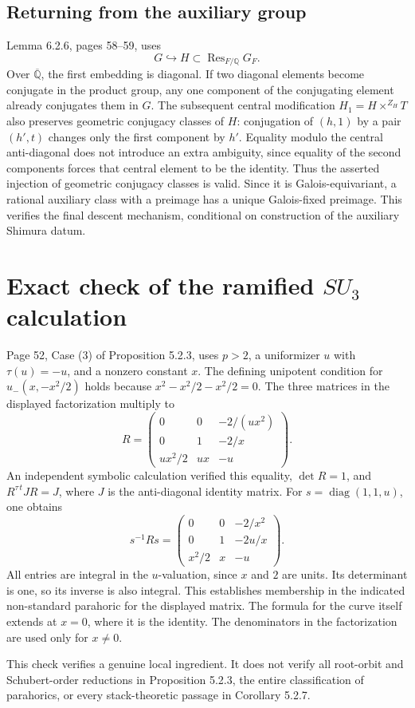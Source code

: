 \documentclass[10pt]{article}
\begin{document}
\subsection*{Returning from the auxiliary group}
Lemma 6.2.6, pages 58–59, uses \[G\hookrightarrow H\subset\operatorname{Res}_{F/\mathbb Q}G_F.\] Over \(\overline{\mathbb Q}\), the first embedding is diagonal. If two diagonal elements become conjugate in the product group, any one component of the conjugating element already conjugates them in \(G\). The subsequent central modification \(H_1=H\times^{Z_H}T\) also preserves geometric conjugacy classes of \(H\): conjugation of \((h,1)\) by a pair \((h',t)\) changes only the first component by \(h'\). Equality modulo the central anti-diagonal does not introduce an extra ambiguity, since equality of the second components forces that central element to be the identity. Thus the asserted injection of geometric conjugacy classes is valid. Since it is Galois-equivariant, a rational auxiliary class with a preimage has a unique Galois-fixed preimage. This verifies the final descent mechanism, conditional on construction of the auxiliary Shimura datum.\par
\section*{Exact check of the ramified \(SU_3\) calculation}
Page 52, Case (3) of Proposition 5.2.3, uses \(p>2\), a uniformizer \(u\) with \(\tau(u)=-u\), and a nonzero constant \(x\). The defining unipotent condition for \(u_-(x,-x^2/2)\) holds because \(x^2-x^2/2-x^2/2=0\). The three matrices in the displayed factorization multiply to \[R=
 \begin{pmatrix}
 0&0&-2/(ux^2)\\
 0&1&-2/x\\
 ux^2/2&ux&-u
 \end{pmatrix}.\] An independent symbolic calculation verified this equality, \(\det R=1\), and \(R^{\tau\,t}JR=J\), where \(J\) is the anti-diagonal identity matrix. For \(s=\operatorname{diag}(1,1,u)\), one obtains \[s^{-1}Rs=
 \begin{pmatrix}
 0&0&-2/x^2\\
 0&1&-2u/x\\
 x^2/2&x&-u
 \end{pmatrix}.\] All entries are integral in the \(u\)-valuation, since \(x\) and \(2\) are units. Its determinant is one, so its inverse is also integral. This establishes membership in the indicated non-standard parahoric for the displayed matrix. The formula for the curve itself extends at \(x=0\), where it is the identity. The denominators in the factorization are used only for \(x\ne0\).\par
This check verifies a genuine local ingredient. It does not verify all root-orbit and Schubert-order reductions in Proposition 5.2.3, the entire classification of parahorics, or every stack-theoretic passage in Corollary 5.2.7.\par
\end{document}

